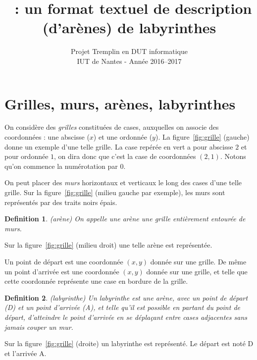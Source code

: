 \documentclass[a4paper]{paper}
\title{\nomFormat{}~: un format textuel de description (d'arènes) de labyrinthes}
\author{\textrm{Projet} \textsf{Tremplin en DUT informatique}\\
\textrm{IUT de Nantes - Année 2016--2017}}
\newtheorem{definition}{Definition}
\begin{document}
\maketitle

\section{Grilles, murs, arènes, labyrinthes}

On considère des \emph{grilles} constituées de cases, auxquelles on associe des coordonnées : une abscisse ($x$) et une ordonnée ($y$).
La figure~\ref{fig:grille} (gauche) donne un exemple d'une telle grille.
La case repérée en vert a pour abscisse $2$ et pour ordonnée $1$, on dira donc que c'est la case de coordonnées $(2, 1)$. Notons qu'on commence la numérotation par 0.

On peut placer des \emph{murs} horizontaux et verticaux le long des cases d'une telle grille.
Sur la figure~\ref{fig:grille} (milieu gauche par exemple), les murs sont représentés par des traits noirs épais.

\begin{definition}{(arène)}
On appelle une \emph{arène} une grille entièrement entourée de murs.
\end{definition}

Sur la figure~\ref{fig:grille} (milieu droit) une telle arène est représentée.

Un point de départ est une coordonnée $(x,y)$ donnée sur une grille. 
De m\^eme un point d'arrivée est une coordonnée $(x,y)$ donnée sur une grille, et telle que cette coordonnée représente une case en bordure de la grille. 

\begin{definition}{(\emph{labyrinthe})}
Un labyrinthe est une arène, avec  un point de départ (D) et un point d'arrivée (A), et telle qu'il est possible en partant du point de départ, d'atteindre le point d'arrivée en se déplaçant entre cases adjacentes sans jamais couper un mur.
\end{definition}

Sur la figure~\ref{fig:grille} (droite) un labyrinthe est représenté.
Le départ est noté D et l'arrivée A.
\end{document}
